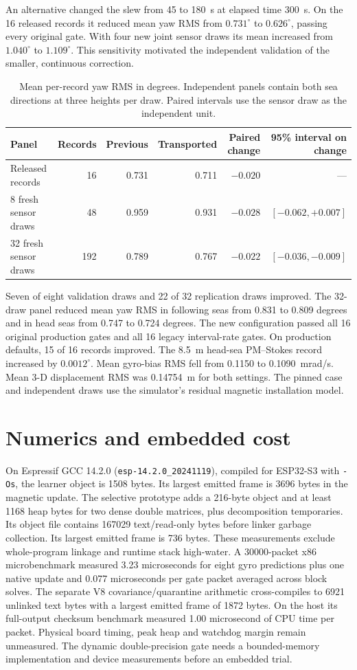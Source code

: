 \documentclass[conference]{IEEEtran}
\begin{document}
An alternative changed the slew from 45 to 180~s at elapsed time 300~s. On the 16 released records it reduced mean yaw RMS from $0.731^\circ$ to $0.626^\circ$, passing every original gate. With four new joint sensor draws its mean increased from $1.040^\circ$ to $1.109^\circ$. This sensitivity motivated the independent validation of the smaller, continuous correction.

\begin{table}[t]\centering\small
\caption{Mean per-record yaw RMS in degrees. Independent panels contain both sea directions at three heights per draw. Paired intervals use the sensor draw as the independent unit.}
\begin{tabular}{lrrrrr}\toprule
Panel & Records & Previous & Transported & Paired change & 95\% interval on change\\\midrule
Released records & 16 & 0.731 & 0.711 & $-0.020$ & --- \\
8 fresh sensor draws & 48 & 0.959 & 0.931 & $-0.028$ & $[-0.062, +0.007]$ \\
32 fresh sensor draws & 192 & 0.789 & 0.767 & $-0.022$ & $[-0.036, -0.009]$ \\
\end{tabular}\end{table}

Seven of eight validation draws and 22 of 32 replication draws improved. The 32-draw panel reduced mean yaw RMS in following seas from 0.831 to 0.809 degrees and in head seas from 0.747 to 0.724 degrees. The new configuration passed all 16 original production gates and all 16 legacy interval-rate gates. On production defaults, 15 of 16 records improved. The 8.5~m head-sea PM--Stokes record increased by $0.0012^\circ$. Mean gyro-bias RMS fell from 0.1150 to 0.1090~mrad/s. Mean 3-D displacement RMS was 0.14754~m for both settings. The pinned case and independent draws use the simulator's residual magnetic installation model.

\section{Numerics and embedded cost}
On Espressif GCC 14.2.0 (\texttt{esp-14.2.0\_20241119}), compiled for ESP32-S3 with \texttt{-Os}, the learner object is 1508 bytes. Its largest emitted frame is 3696 bytes in the magnetic update. The selective prototype adds a 216-byte object and at least 1168 heap bytes for two dense double matrices, plus decomposition temporaries. Its object file contains 167029 text/read-only bytes before linker garbage collection. Its largest emitted frame is 736 bytes. These measurements exclude whole-program linkage and runtime stack high-water. A 30000-packet x86 microbenchmark measured 3.23 microseconds for eight gyro predictions plus one native update and 0.077 microseconds per gate packet averaged across block solves. The separate V8 covariance/quarantine arithmetic cross-compiles to 6921 unlinked text bytes with a largest emitted frame of 1872 bytes. On the host its full-output checksum benchmark measured 1.00 microsecond of CPU time per packet. Physical board timing, peak heap and watchdog margin remain unmeasured. The dynamic double-precision gate needs a bounded-memory implementation and device measurements before an embedded trial.
\end{document}
